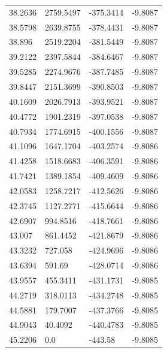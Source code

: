 \begin{table}[H]
\begin{tabular}{llll}
38.2636 & 2759.5497 & -375.3414 & -9.8087 \\
38.5798 & 2639.8755 & -378.4431 & -9.8087 \\
38.896 & 2519.2204 & -381.5449 & -9.8087 \\
39.2122 & 2397.5844 & -384.6467 & -9.8087 \\
39.5285 & 2274.9676 & -387.7485 & -9.8087 \\
39.8447 & 2151.3699 & -390.8503 & -9.8087 \\
40.1609 & 2026.7913 & -393.9521 & -9.8087 \\
40.4772 & 1901.2319 & -397.0538 & -9.8087 \\
40.7934 & 1774.6915 & -400.1556 & -9.8087 \\
41.1096 & 1647.1704 & -403.2574 & -9.8086 \\
41.4258 & 1518.6683 & -406.3591 & -9.8086 \\
41.7421 & 1389.1854 & -409.4609 & -9.8086 \\
42.0583 & 1258.7217 & -412.5626 & -9.8086 \\
42.3745 & 1127.2771 & -415.6644 & -9.8086 \\
42.6907 & 994.8516 & -418.7661 & -9.8086 \\
43.007 & 861.4452 & -421.8679 & -9.8086 \\
43.3232 & 727.058 & -424.9696 & -9.8086 \\
43.6394 & 591.69 & -428.0714 & -9.8086 \\
43.9557 & 455.3411 & -431.1731 & -9.8085 \\
44.2719 & 318.0113 & -434.2748 & -9.8085 \\
44.5881 & 179.7007 & -437.3766 & -9.8085 \\
44.9043 & 40.4092 & -440.4783 & -9.8085 \\
45.2206 & 0.0 & -443.58 & -9.8085 \\
\bottomrule
\end{tabular}

\end{table}
